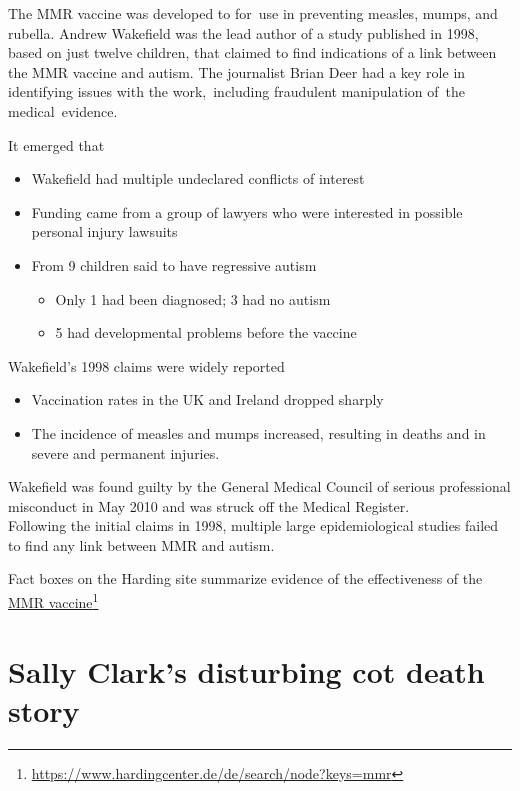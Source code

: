 \documentclass[
  10ptls,
  b5paper]{book}
\providecommand{\tightlist}{%
  \setlength{\itemsep}{0pt}\setlength{\parskip}{0pt}}
\begin{document}
The MMR vaccine was developed to for~use in preventing measles,
mumps, and rubella. Andrew Wakefield was the lead author of a
study published in 1998, based on just twelve children, that
claimed to find indications of a link between the MMR vaccine
and autism. The journalist Brian Deer had a key role in
identifying issues with the work,~including fraudulent
manipulation of~the medical~evidence.

It emerged that

\begin{itemize}
\tightlist
\item
  Wakefield had multiple undeclared conflicts of interest
\item
  Funding came from a group of lawyers who were interested
  in possible personal injury lawsuits
\item
  From 9 children said to have regressive autism

  \begin{itemize}
  \tightlist
  \item
    Only 1 had been diagnosed; 3 had no autism
  \item
    5 had developmental problems before the vaccine
  \end{itemize}
\end{itemize}

Wakefield's 1998 claims were widely reported

\begin{itemize}
\tightlist
\item
  Vaccination rates in the UK and Ireland dropped sharply
\item
  The incidence of measles and mumps increased, resulting
  in deaths and in severe and permanent injuries.
\end{itemize}

Wakefield was found guilty by the General Medical Council of serious professional misconduct in May 2010 and was struck off the Medical Register.\\
Following the initial claims in 1998, multiple large epidemiological studies failed to find any link between MMR and autism.

Fact boxes on the Harding site summarize evidence of the
effectiveness of the \href{https://www.hardingcenter.de/de/search/node?keys=mmr}{MMR vaccine}\footnote{\url{https://www.hardingcenter.de/de/search/node?keys=mmr}}

\hypertarget{sally-clarks-disturbing-cot-death-story}{%
\section{Sally Clark's disturbing cot death story}\label{sally-clarks-disturbing-cot-death-story}}
\end{document}
